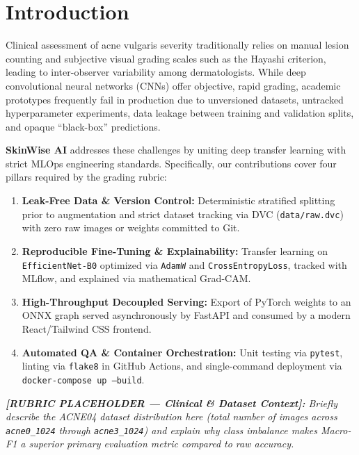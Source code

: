 \documentclass[11pt,a4paper]{article}
\begin{document}
\section{Introduction}
\label{sec:introduction}
Clinical assessment of acne vulgaris severity traditionally relies on manual lesion counting and subjective visual grading scales such as the Hayashi criterion, leading to inter-observer variability among dermatologists. While deep convolutional neural networks (CNNs) offer objective, rapid grading, academic prototypes frequently fail in production due to unversioned datasets, untracked hyperparameter experiments, data leakage between training and validation splits, and opaque ``black-box'' predictions.

\textbf{SkinWise AI} addresses these challenges by uniting deep transfer learning with strict MLOps engineering standards. Specifically, our contributions cover four pillars required by the grading rubric:
\begin{enumerate}[noitemsep,topsep=2pt]
    \item \textbf{Leak-Free Data \& Version Control:} Deterministic stratified splitting prior to augmentation and strict dataset tracking via DVC (\texttt{data/raw.dvc}) with zero raw images or weights committed to Git.
    \item \textbf{Reproducible Fine-Tuning \& Explainability:} Transfer learning on \texttt{EfficientNet-B0} optimized via \texttt{AdamW} and \texttt{CrossEntropyLoss}, tracked with MLflow, and explained via mathematical Grad-CAM.
    \item \textbf{High-Throughput Decoupled Serving:} Export of PyTorch weights to an ONNX graph served asynchronously by FastAPI and consumed by a modern React/Tailwind CSS frontend.
    \item \textbf{Automated QA \& Container Orchestration:} Unit testing via \texttt{pytest}, linting via \texttt{flake8} in GitHub Actions, and single-command deployment via \texttt{docker-compose up --build}.
\end{enumerate}

\noindent
\textit{\textbf{[RUBRIC PLACEHOLDER --- Clinical \& Dataset Context]:} Briefly describe the ACNE04 dataset distribution here (total number of images across \texttt{acne0\_1024} through \texttt{acne3\_1024}) and explain why class imbalance makes Macro-F1 a superior primary evaluation metric compared to raw accuracy.}

\end{document}
